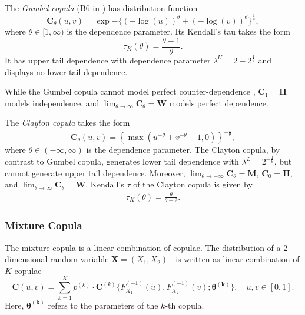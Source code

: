 The {\em Gumbel copula\/} (B6 in \citet{joe1997multivariate}) has
distribution function
\begin{equation*}
  \bm{C}_{\theta}(u,v) = \exp{-\{ (-\log(u))^\theta +(-\log(v))^\theta 
    \}^{\frac{1}{\theta}}},
\end{equation*}
where $\theta \in [1,\infty)$ is the dependence parameter.
Its  Kendall's tau takes the form \begin{equation*}
  \tau_K(\theta) =\frac{\theta-1}{\theta}. 
 \end{equation*}
It has upper tail dependence with dependence parameter $\lambda^U
= 2-2^{\frac{1}{\theta}}$ and displays no lower tail dependence. 
    
While the Gumbel copula cannot model perfect counter-dependence
\citep{Nelsen2002}, $\bm{C}_{1} = \bm{\Pi}$ models independence, 
and $\lim_{\theta\rightarrow\infty} \bm{C}_\theta = \bm{W}$ models
perfect dependence. 


The {\em Clayton copula\/} takes the form
\begin{equation*}
  \bm{C}_{\theta}(u,v) = \left\{
    \max(u^{-\theta}+v^{-\theta}-1,0)\right\}^{-\frac{1}{\theta}},
\end{equation*}
where $\theta \in (-\infty, \infty)$ is the dependence parameter.
The Clayton copula, by contrast to Gumbel copula,
generates lower tail dependence with $\lambda^L =
2^{-\frac{1}{\theta}}$, but cannot generate upper tail dependence.
Moreover, $\lim_{\theta\rightarrow -\infty} \bm{C}_\theta = \bm{M}$, $\bm{C}_0 =
\bm{\Pi}$, and $\lim_{\theta\rightarrow\infty} \bm{C}_\theta = \bm{W}$. 
Kendall's $\tau$ of the Clayton copula is given by 
\begin{align*}
    \tau_K(\theta) =\frac{\theta}{\theta+2}.
    \end{align*}

\subsubsection{Mixture Copula}\label{sec:mixture-copula}
The mixture copula is a linear combination of copulae. 
The distribution of a 2-dimensional random variable
$\bm{X}=(X_1,X_2)^\top$ is written as linear combination of $K$
copulae 
\begin{equation*} 
    \bm{C}(u,v)= \sum_{k=1}^K p^{(k)} \cdot \bm{C}^{(k)}\{F^{(-1)}_{X_1}(u),
    F^{(-1)}_{X_2}(v); \bm{\theta^{(k)}}\}, \quad u,v\in [0,1].
  \end{equation*}
  Here, $\bm{\theta^{(k)}}$ refers to the parameters of the
    $k$-th copula.
   
